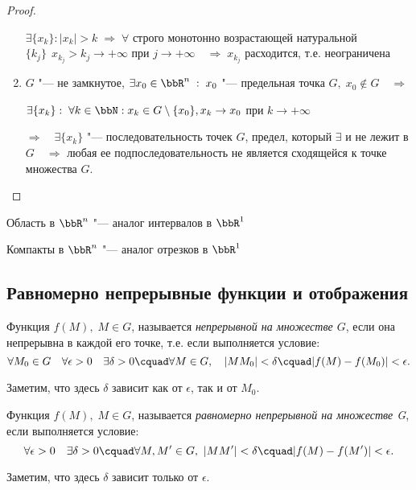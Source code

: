 \begin{proof}
\begin{enumerate}[wide, labelwidth=!, labelindent=\parindent]
$\exists \{ x_k \}: |x_k| > k \; \Rightarrow \; \forall$ строго монотонно возрастающей натуральной $\{ k_j \}\ \  x_{k_j} > k_j \to +\infty$ при $j \to +\infty \quad \Rightarrow \; x_{k_j}$ расходится, т.е. неограничена 

\item

$G$ "--- не замкнутое, $\exists x_0 \in \bbR^n \;:\; x_0$ "--- предельная точка $G, \; x_0 \notin G \quad \Rightarrow$

$\exists \{ x_k \}: \; \forall k \in \bbN: x_k \in G \setminus \{ x_0 \}, x_k \to x_0$ при $k \to +\infty$

$\Rightarrow \quad \exists \{ x_k \}$ "--- последовательность точек $G$, предел, который $\exists$ и не лежит в $G \quad \Rightarrow$  любая ее подпоследовательность не является сходящейся к точке множества $G$.\qedhere
\end{enumerate}
\end{proof}
Область в $\bbR^n$ "--- аналог интервалов в $\bbR^1$

Компакты в $\bbR^n$ "--- аналог отрезков в $\bbR^1$



\subsection{Равномерно непрерывные функции и отображения}

\begin{defn}
Функция $f(M),\;M\in G$, называется \textit{непрерывной на множестве $G$}, если она непрерывна в каждой его точке, т.е. если выполняется условие:
\begin{equation}\label{yaa45e1}
\forall M_0\in G\quad \forall\epsilon>0 \quad \exists\delta>0\cquad\forall M\in G,\quad |MM_0|<\delta\cquad|f(M)-f(M_0)|<\epsilon.
\end{equation}
\end{defn}
Заметим, что здесь $\delta$ зависит как от $\epsilon$, так и от $M_0$.

\begin{defn}
Функция $f(M),\; M\in G$, называется \textit{равномерно непрерывной на множестве G}, если выполняется условие:
\begin{equation}\label{yaa45e2}
\forall\epsilon>0\quad\exists\delta>0\cquad\forall M, M'\in G,\ |MM'|<\delta\cquad |f(M)-f(M')|<\epsilon.
\end{equation}
\end{defn}
Заметим, что здесь $\delta$ зависит только от $\epsilon$.

